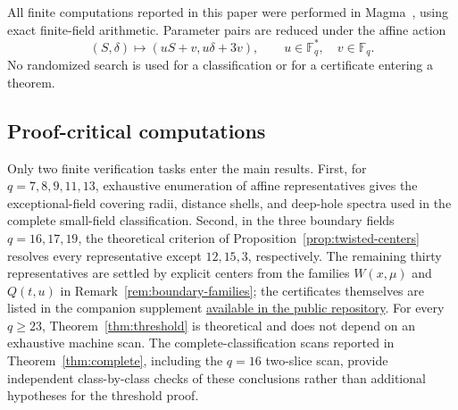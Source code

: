 ﻿\documentclass[11pt]{article}
\newcommand{\F}{\mathbb F}
\theoremstyle{plain}
\theoremstyle{definition}
\begin{document}
All finite computations reported in this paper were performed in
Magma~\cite{Magma1997}, using exact finite-field arithmetic.  Parameter pairs are
reduced under the affine action
\[
 (S,\delta)\longmapsto (uS+v,u\delta+3v),
 \qquad u\in\F_q^{\ast},\quad v\in\F_q.
\]
No randomized search is used for a classification or for a certificate
entering a theorem.

\subsection*{Proof-critical computations}
Only two finite verification tasks enter the main results.  First, for
\(q=7,8,9,11,13\), exhaustive enumeration of affine representatives gives
the exceptional-field covering radii, distance shells, and deep-hole spectra
used in the complete small-field classification.  Second, in the three
boundary fields \(q=16,17,19\), the theoretical criterion of
Proposition~\ref{prop:twisted-centers} resolves every representative except
\(12,15,3\), respectively.  The remaining thirty representatives are
settled by explicit centers from the families \(W(x,\mu)\) and \(Q(t,u)\)
in Remark~\ref{rem:boundary-families}; the certificates themselves are
listed in the companion supplement
\href{https://github.com/matheorist/roth-lempel-covering-radius/blob/main/%
certificates/supplement.tex}
{available in the public repository}.
For every \(q\geq 23\), Theorem~\ref{thm:threshold} is theoretical and does
not depend on an exhaustive machine scan.  The complete-classification scans
reported in Theorem~\ref{thm:complete}, including the \(q=16\) two-slice
scan, provide independent class-by-class checks of these conclusions rather
than additional hypotheses for the threshold proof.
\end{document}
